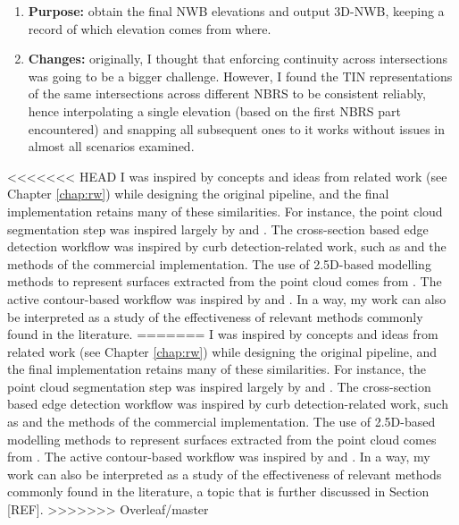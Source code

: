 \begin{enumerate}
\begin{enumerate}
\begin{enumerate}
        \end{enumerate}
        \item \textbf{Purpose:} obtain the final NWB elevations and output 3D-NWB, keeping a record of which elevation comes from where.
        \item \textbf{Changes:} originally, I thought that enforcing continuity across intersections was going to be a bigger challenge. However, I found the TIN representations of the same intersections across different NBRS to be consistent reliably, hence interpolating a single elevation (based on the first NBRS part encountered) and snapping all subsequent ones to it works without issues in almost all scenarios examined.
    \end{enumerate}
\end{enumerate}

<<<<<<< HEAD
I was inspired by concepts and ideas from related work (see Chapter \ref{chap:rw}) while designing the original pipeline, and the final implementation retains many of these similarities. For instance, the point cloud segmentation step was inspired largely by \cite{oudeElberink_vosselman_2009} and \cite{boyko_funkhauser_2011}. The cross-section based edge detection workflow was inspired by curb detection-related work, such as \cite{yang_etal_2013} and the methods of the commercial implementation. The use of 2.5D-based modelling methods to represent surfaces extracted from the point cloud comes from \cite{oudeElberink_vosselman_2006}. The active contour-based workflow was inspired by \cite{boyko_funkhauser_2011} and \cite{gopfert_etal_2011}. In a way, my work can also be interpreted as a study of the effectiveness of relevant methods commonly found in the literature.
=======
I was inspired by concepts and ideas from related work (see Chapter \ref{chap:rw}) while designing the original pipeline, and the final implementation retains many of these similarities. For instance, the point cloud segmentation step was inspired largely by \cite{oudeElberink_vosselman_2009} and \cite{boyko_funkhauser_2011}. The cross-section based edge detection workflow was inspired by curb detection-related work, such as \cite{yang_etal_2013} and the methods of the commercial implementation. The use of 2.5D-based modelling methods to represent surfaces extracted from the point cloud comes from \cite{oudeElberink_vosselman_2006}. The active contour-based workflow was inspired by \cite{boyko_funkhauser_2011} and \cite{gopfert_etal_2011}. In a way, my work can also be interpreted as a study of the effectiveness of relevant methods commonly found in the literature, a topic that is further discussed in Section [REF].
>>>>>>> Overleaf/master

